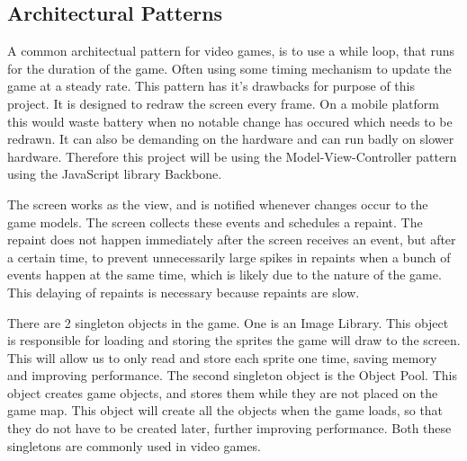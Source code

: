 \subsection{Architectural Patterns}

A common architectual pattern for video games, is to use a while loop, that runs for the duration of the game. Often using some timing mechanism to update the game at a steady rate. This pattern has it's drawbacks for purpose of this project. It is designed to redraw the screen every frame. On a mobile platform this would waste battery when no notable change has occured which needs to be redrawn. It can also be demanding on the hardware and can run badly on slower hardware. Therefore this project will be using the Model-View-Controller pattern using the JavaScript library Backbone.

The screen works as the view, and is notified whenever changes occur to the game models. The screen collects these events and schedules a repaint. The repaint does not happen immediately after the screen receives an event, but after a certain time, to prevent unnecessarily large spikes in repaints when a bunch of events happen at the same time, which is likely due to the nature of the game. This delaying of repaints is necessary because repaints are slow.

There are 2 singleton objects in the game. One is an Image Library. This object is responsible for loading and storing the sprites the game will draw to the screen. This will allow us to only read and store each sprite one time, saving memory and improving performance. The second singleton object is the Object Pool. This object creates game objects, and stores them while they are not placed on the game map. This object will create all the objects when the game loads, so that they do not have to be created later, further improving performance. Both these singletons are commonly used in video games.
